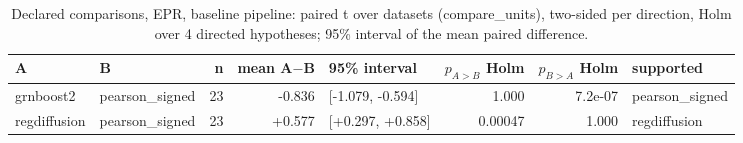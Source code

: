 \begin{table}[H]\centering\small
\caption{Declared comparisons, EPR, baseline pipeline: paired t over datasets (compare\_units), two-sided per direction, Holm over 4 directed hypotheses; 95\% interval of the mean paired difference.}
\begin{tabular}{llrrlrrl}\toprule
A & B & n & mean A$-$B & 95\% interval & $p_{A>B}$ Holm & $p_{B>A}$ Holm & supported \\ \midrule
grnboost2 & pearson\_signed & 23 & -0.836 & [-1.079, -0.594] & 1.000 & 7.2e-07 & pearson\_signed \\
regdiffusion & pearson\_signed & 23 & +0.577 & [+0.297, +0.858] & 0.00047 & 1.000 & regdiffusion \\
\bottomrule\end{tabular}\end{table}
